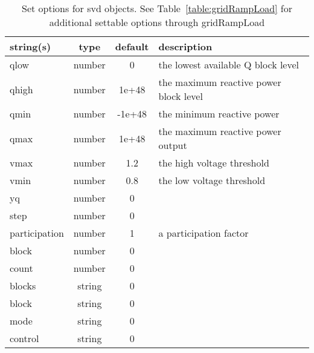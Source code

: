 \begin{table}[ht]
\centering
\begin{tabular}{p{5cm} c c p{7cm}}
\hline
string(s) & type & default & description \\
\hline
qlow & number & 0 & the lowest available Q block level\\
qhigh & number & 1e+48 & the maximum reactive power block level\\
qmin & number & -1e+48 & the minimum reactive power\\
qmax & number & 1e+48 & the maximum reactive power output\\
vmax & number & 1.2 & the high voltage threshold\\
vmin & number & 0.8 & the low voltage threshold\\
yq & number & 0 & \\
step & number & 0 & \\
participation & number & 1 & a participation factor\\
block & number & 0 & \\
count & number & 0 & \\
blocks & string & 0 & \\
block & string & 0 & \\
mode & string & 0 & \\
control & string & 0 & \\
\hline
\end{tabular}
\caption{Set options for svd objects. See Table~\ref{table:gridRampLoad} for additional settable options through gridRampLoad}
\label{table:svd}
\end{table}
